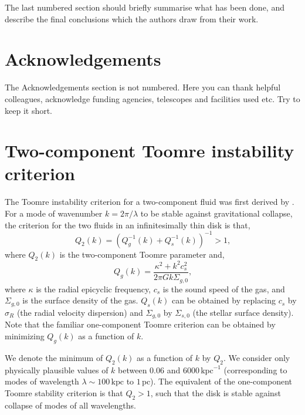 \documentclass[a4paper,fleqn,usenatbib]{mnras}
\newcommand{\pc}{\ensuremath{\text{pc}}}
\newcommand{\kpc}{\ensuremath{\text{kpc}}}
\newcommand{\beq}{\begin{equation}}
\newcommand{\eeq}{\end{equation}}
\begin{document}
The last numbered section should briefly summarise what has been done, and describe
the final conclusions which the authors draw from their work.

\section*{Acknowledgements}

The Acknowledgements section is not numbered. Here you can thank helpful
colleagues, acknowledge funding agencies, telescopes and facilities used etc.
Try to keep it short.






\appendix

\section{Two-component Toomre instability criterion}
The Toomre instability criterion for a two-component fluid was first derived
by \citet{1984ApJ...276..114J}. For a mode of wavenumber $k=2\pi/\lambda$ to
be stable against gravitational collapse, the criterion for the two fluids in
an infinitesimally thin disk is that,
\beq
Q_2(k) = \left(Q_g^{-1}(k) + Q_s^{-1}(k) \right)^{-1} > 1\text{,}
\eeq
where $Q_2(k)$ is the two-component Toomre parameter and,
\beq
Q_g(k) = \frac{\kappa^2 + k^2 c_s^2}{2\pi G k \Sigma_{g,0}}\text{,}
\eeq
where $\kappa$ is the radial epicyclic frequency, $c_s$ is the sound speed of
the gas, and $\Sigma_{g,0}$ is the surface density of the gas. $Q_s(k)$ can be
obtained by replacing $c_s$ by $\sigma_R$ (the radial velocity dispersion) and
$\Sigma_{g,0}$ by $\Sigma_{s,0}$ (the stellar surface density). Note that the
familiar one-component Toomre criterion can be obtained by minimizing $Q_g(k)$
as a function of $k$.

We denote the minimum of $Q_2(k)$ as a function of $k$ by $Q_2$. We consider
only physically plausible values of $k$ between $0.06$ and $6000\,\kpc^{-1}$
(corresponding to modes of wavelength $\lambda\sim100\,\kpc$ to $1\,\pc$). The
equivalent of the one-component Toomre stability criterion is that $Q_2>1$,
such that the disk is stable against collapse of modes of all wavelengths.
\end{document}
